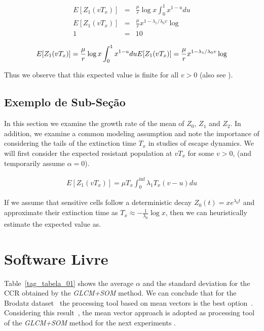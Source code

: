 \documentclass{classe_cn}                 %
\begin{document}
\begin{eqnarray}
\label{eqexpmuts}
  E [Z_1(vT_x)] &=& \frac{\mu}{r}\log x \int_0^{1} x^{1-u} du \\
  E [Z_1(vT_x)] &=& \frac{\mu}{r}x^{1-{\lambda_1}/{\lambda_0}v}\log  \\
  1 &=& 10
\end{eqnarray}

\begin{equation}
  E [Z_1(vT_x)] = \frac{\mu}{r}\log x \int_0^{1} x^{1-u} du \\
  E [Z_1(vT_x)] = \frac{\mu}{r}x^{1-{\lambda_1}/{\lambda_0}v}\log 
\end{equation}

Thus we observe that this expected value is finite for all $v>0$ (also see \cite{Rosenfeld:1970}).

\subsection{Exemplo de Sub-Seção}

In this section we examine the growth rate of the mean of $Z_0$, $Z_1$ and $Z_2$. In addition, we examine a common modeling assumption and note the importance of considering the tails of the extinction time $T_x$ in studies of escape dynamics. We will first consider the expected resistant population at $vT_x$ for some $v>0$, (and temporarily assume $\alpha=0$).

\begin{eqnarray}
E [Z_1(vT_x)]= \mu T_x \int_{0}^{\inf} \lambda_1T_x(v-u)du
\end{eqnarray}

If we assume that sensitive cells follow a deterministic decay $Z_0(t)=xe^{\lambda_0 t}$ and approximate their extinction time as $T_x\approx-\frac{1}{\lambda_0}\log x$, then we can heuristically estimate the expected value as.

\section{Software Livre}

Table~\ref{tag_tabela_01} shows the average $ \alpha $ and the standard deviation for the CCR \cite{Rosenfeld:1970} obtained by the \textit{GLCM+SOM} method. We can conclude that for the Brodatz dataset~\cite{Domingues:2010} the processing tool based on mean vectors is the best option~\cite{Rosenfeld:1970, Diday:1989}. Considering this result~\cite{Visible:2013}, the mean vector approach is adopted as processing tool of the \textit{GLCM+SOM} method for the next experiments \cite{Fulano:2009}.
\end{document}
